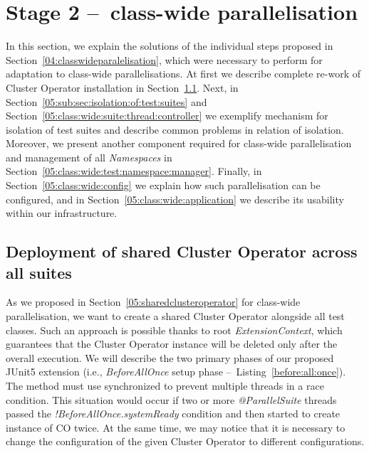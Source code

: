 \section{Stage 2 \---\ class-wide parallelisation}
\label{05:sec:class:wide:parallelism}

In this section, we explain the solutions of the individual steps proposed in Section~\ref{04:classwideparalelisation},
which were necessary to perform for adaptation to class-wide parallelisations.
At first we describe complete re-work of Cluster Operator installation in Section~\ref{05:class:wide:shared:co}.
Next, in Section~\ref{05:sub:sec:isolation:of:test:suites} and Section~\ref{05:class:wide:suite:thread:controller}
we exemplify mechanism for isolation of test suites and describe common problems in relation of isolation.
Moreover, we present another component required for class-wide parallelisation
and management of all \emph{Namespaces} in Section~\ref{05:class:wide:test:namespace:manager}.
Finally, in Section~\ref{05:class:wide:config} we explain how such parallelisation can be configured, and
in Section~\ref{05:class:wide:application} we describe its usability within our infrastructure.

\subsection{Deployment of shared Cluster Operator across all suites}
\label{05:class:wide:shared:co}

As we proposed in Section~\ref{05:sharedclusteroperator} for class-wide parallelisation,
we want to create a shared Cluster Operator alongside all test classes.
Such an approach is possible thanks to root \emph{ExtensionContext}, which guarantees that the Cluster Operator instance
will be deleted only after the overall execution. We will describe the two primary phases of our proposed JUnit5 extension
(i.e., \emph{BeforeAllOnce} setup phase \---\ Listing~\ref{before:all:once}).
The method must use synchronized to prevent multiple threads in a race condition.
This situation would occur if two or more \emph{@ParallelSuite} threads passed the \emph{!BeforeAllOnce.systemReady}
condition and then started to create instance of CO twice.
At the same time, we may notice that it is necessary to change the configuration of the given Cluster Operator to different configurations.


